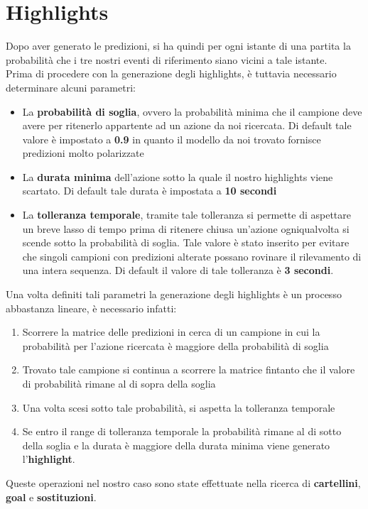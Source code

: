 \section{Highlights}
Dopo aver generato le predizioni, si ha quindi per ogni istante di una partita la probabilità che i tre nostri eventi di riferimento siano vicini a tale istante.
\\Prima di procedere con la generazione degli highlights, è tuttavia necessario determinare alcuni parametri:
\begin{itemize}
\item La \textbf{probabilità di soglia}, ovvero la probabilità minima che il campione deve avere per ritenerlo appartente ad un azione da noi ricercata. Di default tale valore è impostato a \textbf{0.9} in quanto il modello da noi trovato fornisce predizioni molto polarizzate
\item La \textbf{durata minima} dell'azione sotto la quale il nostro highlights viene scartato. Di default tale durata è impostata a \textbf{10 secondi}
\item La \textbf{tolleranza temporale}, tramite tale tolleranza si permette di aspettare un breve lasso di tempo prima di ritenere chiusa un'azione ogniqualvolta si scende sotto la probabilità di soglia.
Tale valore è stato inserito per evitare che singoli campioni con predizioni alterate possano rovinare il rilevamento di una intera sequenza. Di default il valore di tale tolleranza è \textbf{3 secondi}.
\end{itemize}
Una volta definiti tali parametri la generazione degli highlights è un processo abbastanza lineare, è necessario infatti:
\begin{enumerate}
\item Scorrere la matrice delle predizioni in cerca di un campione in cui la probabilità per l'azione ricercata è maggiore della probabilità di soglia
\item Trovato tale campione si continua a scorrere la matrice fintanto che il valore di probabilità rimane al di sopra della soglia
\item Una volta scesi sotto tale probabilità, si aspetta la tolleranza temporale
\item Se entro il range di tolleranza temporale la probabilità rimane al di sotto della soglia e la durata è maggiore della durata minima viene generato l'\textbf{highlight}.
\end{enumerate}
Queste operazioni nel nostro caso sono state effettuate nella ricerca di \textbf{cartellini}, \textbf{goal} e \textbf{sostituzioni}.
